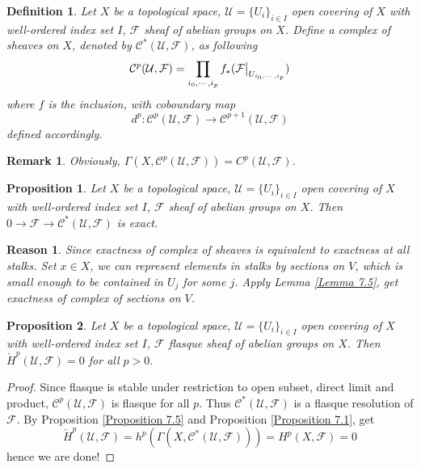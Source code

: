\documentclass{ctexart}
\newtheorem{definition}{Definition}[section]
\newtheorem{remark}{Remark}[section]
\newtheorem{proposition}{Proposition}[section]
\newtheorem{reason}{Reason}[section]
\begin{document}
\begin{definition}
    Let $X$ be a topological space, $\mathcal{U} = \{U_{i}\}_{i\in I}$ open covering of $X$ with well-ordered index set $I$, $\mathcal{F}$ sheaf of abelian groups on $X$.
    Define a complex of sheaves on $X$, denoted by $\mathcal{C}^{\ast}(\mathcal{U}, \mathcal{F})$, as following
    \begin{equation*}
        \mathcal{C}^{p}(\mathcal{U}, \mathcal{F}) = \prod_{i_{0}, \cdots, i_{p}} f_{\ast}(\mathcal{F}\big{|}_{U_{i_{0}, \cdots, i_{p}}})
    \end{equation*}
    where $f$ is the inclusion, with coboundary map
    \begin{equation*}
        d^{p}: \mathcal{C}^{p}(\mathcal{U}, \mathcal{F}) \longrightarrow \mathcal{C}^{p + 1}(\mathcal{U}, \mathcal{F})
    \end{equation*}
    defined accordingly.
\end{definition}
\begin{remark}
    Obviously, $\Gamma(X, \mathcal{C}^{p}(\mathcal{U}, \mathcal{F})) = C^{p}(\mathcal{U}, \mathcal{F})$.
\end{remark}
\begin{proposition}
    Let $X$ be a topological space, $\mathcal{U} = \{U_{i}\}_{i\in I}$ open covering of $X$ with well-ordered index set $I$, $\mathcal{F}$ sheaf of abelian groups on $X$.
    Then $0 \longrightarrow \mathcal{F} \longrightarrow \mathcal{C}^{\ast}(\mathcal{U}, \mathcal{F})$ is exact.
    \vspace{-\baselineskip} %
    \label{Proposition 7.7}
\end{proposition}
\begin{reason}
    Since exactness of complex of sheaves is equivalent to exactness at all stalks.
    Set $x\in X$, we can represent elements in stalks by sections on $V$, which is small enough to be contained in $U_{j}$ for some $j$.
    Apply Lemma \ref{Lemma 7.5}, get exactness of complex of sections on $V$.
\end{reason}
\begin{proposition}
    Let $X$ be a topological space, $\mathcal{U} = \{U_{i}\}_{i\in I}$ open covering of $X$ with well-ordered index set $I$, $\mathcal{F}$ flasque sheaf of abelian groups on $X$.
    Then $\check{H}^{p}(\mathcal{U}, \mathcal{F}) = 0$ for all $p > 0$.
    \vspace{-\baselineskip} %
    \label{Proposition 7.8}
\end{proposition}
\begin{proof}
    Since flasque is stable under restriction to open subset, direct limit and product, $\mathcal{C}^{p}(\mathcal{U}, \mathcal{F})$ is flasque for all $p$.
    Thus $\mathcal{C}^{\ast}(\mathcal{U}, \mathcal{F})$ is a flasque resolution of $\mathcal{F}$.
    By Proposition \ref{Proposition 7.5} and Proposition \ref{Proposition 7.1}, get
    \begin{equation*}
        \check{H}^{p}(\mathcal{U}, \mathcal{F}) = h^{p}(\Gamma(X, \mathcal{C}^{\ast}(\mathcal{U}, \mathcal{F}))) = H^{p}(X, \mathcal{F}) = 0
    \end{equation*}
    hence we are done!
\end{proof}
\end{document}
